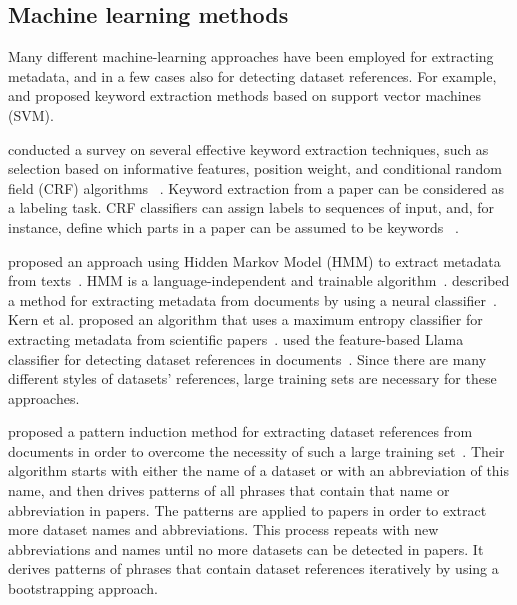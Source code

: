\documentclass{IOS-Book-Article}
\begin{document}
\subsection{Machine learning methods}
Many different machine-learning approaches have been employed for extracting metadata, and in a few cases also for detecting dataset references. For example, \citeauthor{Zhang2006} \citeyearpar{Zhang2006} and \citeauthor{Han2003} \citeyearpar{Han2003} proposed keyword extraction methods based on support vector machines (SVM). 

\citeauthor{Kaur2010} conducted a survey on several effective keyword extraction techniques, such as selection based on informative features, position weight, and conditional random field (CRF) algorithms ~\citeyearpar{Kaur2010}. Keyword extraction from a paper can be considered as a labeling task. CRF classifiers can assign labels to sequences of input, and, for instance, define which parts in a paper can be assumed to be keywords ~\citep{ZHANG2008}.

\citeauthor{Cui2010} proposed an approach using Hidden Markov Model (HMM) to extract metadata from texts~\citeyearpar{Cui2010}. 
HMM is a language-independent and trainable algorithm~\cite{Kubala1998}. \citeauthor{Marinai2009} described a method for extracting metadata from documents by using a neural classifier~\citeyearpar{Marinai2009}. Kern et al. proposed an algorithm that uses a maximum entropy classifier for extracting metadata from scientific papers~\cite{Kern2012}.
\citeauthor{MeiyuLu2012} used the feature-based Llama classifier for detecting dataset references in documents~\citeyearpar{MeiyuLu2012}. Since there are many different styles of datasets' references, large training sets are necessary for these approaches.

\citeauthor{Boland2012} proposed a pattern induction method for extracting dataset references from documents in order to overcome the necessity of such a large training set~\citeyearpar{Boland2012}.
Their algorithm starts with either the name of a dataset or with an abbreviation of this name, and then drives patterns of all phrases that contain that name or abbreviation in papers. The patterns are applied to papers in order to extract more dataset names and abbreviations. This process repeats with new abbreviations and names until no more datasets can be detected in papers. It derives patterns of phrases that contain dataset references iteratively by using a bootstrapping approach.
\end{document}
